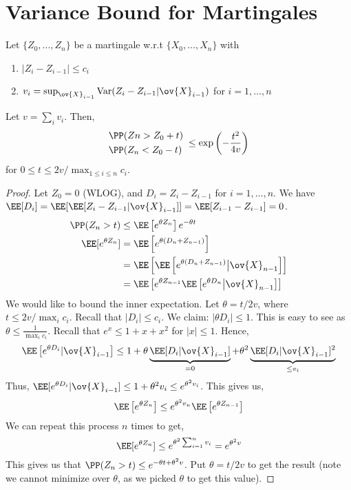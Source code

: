 \section{Variance Bound for Martingales}
\begin{theorem}
Let $\{Z_0, \dots, Z_n\}$ be a martingale w.r.t $\{X_0, \dots, X_n\}$ with
\begin{enumerate}
    \item $|Z_i - Z_{i-1}| \leq c_i$
    \item $v_i = \sup_{\ov{X}_{i-1}} \text{Var}(Z_i - Z_{i-1} | \ov{X}_{i-1})$ for $i=1,\dots,n$
\end{enumerate}
Let $v = \sum_{i} v_i$. Then,
\begin{equation}
\begin{split}
    &\PP(Zn > Z_0 + t) \\ 
    &\PP(Z_n < Z_0 - t)
\end{split}\;\leq \exp\left(-\frac{t^2}{4v}\right)
\end{equation}
for $0 \leq t \leq 2v/\max_{1\leq i \leq n} c_i$.
\end{theorem}
\begin{proof}
Let $Z_0 = 0$ (WLOG), and $D_i = Z_i - Z_{i-1}$ for $i = 1, \dots, n$. We have $\EE[D_i] = \EE[\EE[Z_i - Z_{i-1} | \ov{X}_{i-1}]] = \EE[Z_{i-1} - Z_{i-1}] = 0$. 
\begin{align*}
\PP(Z_n > t) &\leq \EE\left[e^{\theta Z_n}\right]e^{-\theta t} \\
\EE[e^{\theta Z_n}] &= \EE\left[e^{\theta(D_n + Z_{n-1})}\right] \\
&= \EE\left[\EE\left[e^{\theta (D_n + Z_{n-1})} \big| \ov{X}_{n-1}\right]\right] \\
&= \EE\left[e^{\theta Z_{n-1}} {\EE\left[e^{\theta D_n} \big| \ov{X}_{n-1}\right]}\right]
\end{align*}
We would like to bound the inner expectation. Let $\theta = t/2v$, where $t \leq 2v/\max_i c_i$. Recall that $|D_i| \leq c_i$. We claim: $|\theta D_i| \leq 1$. This is easy to see as $\theta \leq \frac{1}{\max_i c_i}$. Recall that $e^x \leq 1 + x + x^2$ for $|x| \leq 1$. Hence,
\[
\EE\left[e^{\theta D_i} | \ov{X}_{i-1}\right] \leq 1 + \theta \underbrace{\EE[D_i | \ov{X}_{i-1}]}_{=0} + \theta^2 \underbrace{\EE[D_i | \ov{X}_{i-1}]^2}_{\leq v_i}
\]
Thus, $\EE[e^{\theta D_i}|\ov{X}_{i-1}] \leq 1 + \theta^2 v_i \leq e^{\theta^2 v_i}$. This gives us,
\[
\EE\left[e^{\theta Z_n}\right] \leq e^{\theta^2 v_n}\EE\left[e^{\theta Z_{n-1}}\right]
\]
We can repeat this process $n$ times to get,
\[
\EE[e^{\theta Z_n}] \leq e^{\theta^2 \sum_{i=1}^n v_i} = e^{\theta^2 v}
\]
This gives us that $\PP(Z_n > t) \leq e^{-\theta t + \theta^2 v}$. Put $\theta = t/2v$ to get the result (note we cannot minimize over $\theta$, as we picked $\theta$ to get this value).
\end{proof}
